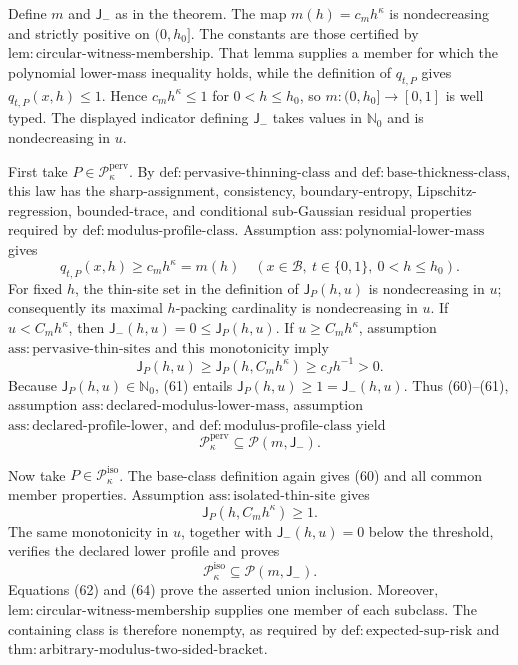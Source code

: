 Define \(m\) and \(\mathsf J_{-}\) as in the theorem.  The map \(m(h)=c_mh^\kappa\) is nondecreasing and strictly positive on \((0,h_0]\).  The constants are those certified by \(\mathrm{lem:circular\text{-}witness\text{-}membership}\).  That lemma supplies a member for which the polynomial lower-mass inequality holds, while the definition of \(q_{t,P}\) gives \(q_{t,P}(x,h)\le 1\).  Hence \(c_mh^\kappa\le1\) for \(0<h\le h_0\), so \(m:(0,h_0]\to[0,1]\) is well typed.  The displayed indicator defining \(\mathsf J_{-}\) takes values in \(\mathbb N_0\) and is nondecreasing in \(u\).

First take \(P\in\mathcal P_{\kappa}^{\mathrm{perv}}\).  By \(\mathrm{def:pervasive\text{-}thinning\text{-}class}\) and \(\mathrm{def:base\text{-}thickness\text{-}class}\), this law has the sharp-assignment, consistency, boundary-entropy, Lipschitz-regression, bounded-trace, and conditional sub-Gaussian residual properties required by \(\mathrm{def:modulus\text{-}profile\text{-}class}\).  Assumption \(\mathrm{ass:polynomial\text{-}lower\text{-}mass}\) gives
\[
 q_{t,P}(x,h)\ge c_mh^\kappa=m(h)
 \quad
 (x\in\mathcal B,\ t\in\{0,1\},\ 0<h\le h_0). \tag{60}
\]
For fixed \(h\), the thin-site set in the definition of \(\mathsf J_P(h,u)\) is nondecreasing in \(u\); consequently its maximal \(h\)-packing cardinality is nondecreasing in \(u\).  If \(u<C_mh^\kappa\), then \(\mathsf J_{-}(h,u)=0\le\mathsf J_P(h,u)\).  If \(u\ge C_mh^\kappa\), assumption \(\mathrm{ass:pervasive\text{-}thin\text{-}sites}\) and this monotonicity imply
\[
 \mathsf J_P(h,u)
 \ge\mathsf J_P(h,C_mh^\kappa)
 \ge c_Jh^{-1}>0. \tag{61}
\]
Because \(\mathsf J_P(h,u)\in\mathbb N_0\), (61) entails \(\mathsf J_P(h,u)\ge1=\mathsf J_{-}(h,u)\).  Thus (60)--(61), assumption \(\mathrm{ass:declared\text{-}modulus\text{-}lower\text{-}mass}\), assumption \(\mathrm{ass:declared\text{-}profile\text{-}lower}\), and \(\mathrm{def:modulus\text{-}profile\text{-}class}\) yield
\[
 \mathcal P_{\kappa}^{\mathrm{perv}}
 \subseteq\mathcal P(m,\mathsf J_{-}). \tag{62}
\]

Now take \(P\in\mathcal P_{\kappa}^{\mathrm{iso}}\).  The base-class definition again gives (60) and all common member properties.  Assumption \(\mathrm{ass:isolated\text{-}thin\text{-}site}\) gives
\[
 \mathsf J_P(h,C_mh^\kappa)\ge1. \tag{63}
\]
The same monotonicity in \(u\), together with \(\mathsf J_{-}(h,u)=0\) below the threshold, verifies the declared lower profile and proves
\[
 \mathcal P_{\kappa}^{\mathrm{iso}}
 \subseteq\mathcal P(m,\mathsf J_{-}). \tag{64}
\]
Equations (62) and (64) prove the asserted union inclusion.  Moreover, \(\mathrm{lem:circular\text{-}witness\text{-}membership}\) supplies one member of each subclass.  The containing class is therefore nonempty, as required by \(\mathrm{def:expected\text{-}sup\text{-}risk}\) and \(\mathrm{thm:arbitrary\text{-}modulus\text{-}two\text{-}sided\text{-}bracket}\).

